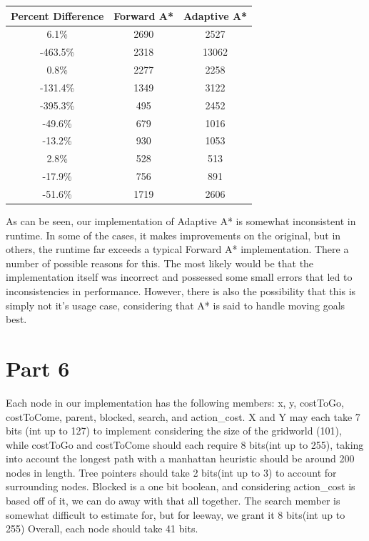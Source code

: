 \documentclass{article}
\begin{document}
\begin{center}
	\begin{tabular}{|c|c|c|}
		\hline
		Percent Difference & Forward A* & Adaptive A* \\
		\hline
		6.1\% & 2690 & 2527 \\
		-463.5\% & 2318 & 13062 \\
		0.8\% & 2277 & 2258 \\
		-131.4\% & 1349 & 3122 \\
		-395.3\% & 495 & 2452 \\
		-49.6\% & 679 & 1016 \\
		-13.2\% & 930 & 1053 \\
		2.8\% & 528 & 513 \\
		-17.9\% & 756 & 891 \\
		-51.6\% & 1719 & 2606 \\
		\hline
	\end{tabular}
\end{center}
As can be seen, our implementation of Adaptive A* is somewhat inconsistent in runtime. In some of the cases, it makes improvements on the original, but in others, the runtime far exceeds a typical Forward A* implementation. There a number of possible reasons for this. The most likely would be that the implementation itself was incorrect and possessed some small errors that led to inconsistencies in performance. However, there is also the possibility that this is simply not it's usage case, considering that A* is said to handle moving goals best. 

\section{Part 6}
Each node in our implementation has the following members: x, y, costToGo, costToCome, parent, blocked, search, and action\_cost. X and Y may each take 7 bits (int up to 127) to implement considering the size of the gridworld (101), while costToGo and costToCome should each require 8 bits(int up to 255), taking into account the longest path with a manhattan heuristic should be around 200 nodes in length. Tree pointers should take 2 bits(int up to 3) to account for surrounding nodes. Blocked is a one bit boolean, and considering action\_cost is based off of it, we can do away with that all together. The search member is somewhat difficult to estimate for, but for leeway, we grant it 8 bits(int up to 255) Overall, each node should take 41 bits.
\end{document}
